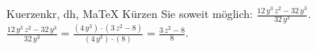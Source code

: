 \begin{MAufgabe}{Kuerzen}{kr, dh, MaTeX}
K\"urzen Sie soweit m\"oglich: $\frac{12\, y^3\, z^2 - 32\, y^3}{32\, y^3}$.\\ 
\ifLsg\MLoesung
\quad $\frac{12\, y^3\, z^2 - 32\, y^3}{32\, y^3}=\frac{(4\, y^3)\cdot(3\, z^2 - 8)}{(4\, y^3)\cdot(8)}=\frac{3\, z^2 - 8}{8}$.\else\relax\fi
 \end{MAufgabe}